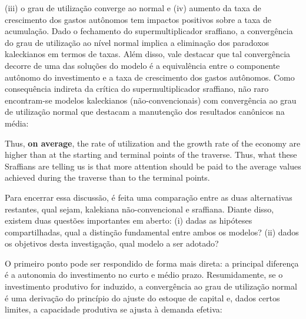(iii) o grau de utilização converge ao normal e 
(iv) aumento da taxa de crescimento dos gastos autônomos tem impactos positivos sobre a taxa de acumulação.
Dado o fechamento do supermultiplicador sraffiano, a convergência do grau de utilização ao nível normal implica a eliminação dos paradoxos kaleckianos em termos de taxas. Além disso, vale destacar que tal convergência decorre de uma das soluções do modelo é a equivalência entre o componente autônomo do investimento e a taxa de crescimento dos gastos autônomos. Como consequência indireta da crítica do supermultiplicador sraffiano, não raro encontram-se modelos kaleckianos (não-convencionais) com convergência ao grau de utilização normal que destacam a manutenção dos resultados canônicos na média:
	
	\begin{citacao}
		Thus, \textbf{on average}, the rate of utilization and the growth rate of the economy are higher than at the starting and terminal points of the traverse. Thus, what these Sraffians are telling us is that more attention should be paid to the average values
		achieved during the traverse than to the terminal points. \cite[p.~408, grifos adicionados]{lavoie_post-keynesian_2015}
	\end{citacao}	

Para encerrar essa discussão, é feita uma comparação entre as duas alternativas restantes, qual sejam, kalekiana não-convencional e sraffiana.  Diante disso, existem duas questões importantes em aberto: (i) dadas as hipóteses compartilhadas, qual a distinção fundamental entre ambos os modelos? (ii) dados os objetivos desta investigação, qual modelo a ser adotado? 

O primeiro ponto pode ser respondido de forma mais direta: a principal diferença é a autonomia do investimento no curto e médio prazo.  Resumidamente, se o investimento produtivo for induzido, a convergência ao grau de utilização normal é uma derivação do princípio do ajuste do estoque de capital e, dados certos limites, a capacidade produtiva se ajusta à demanda efetiva:

